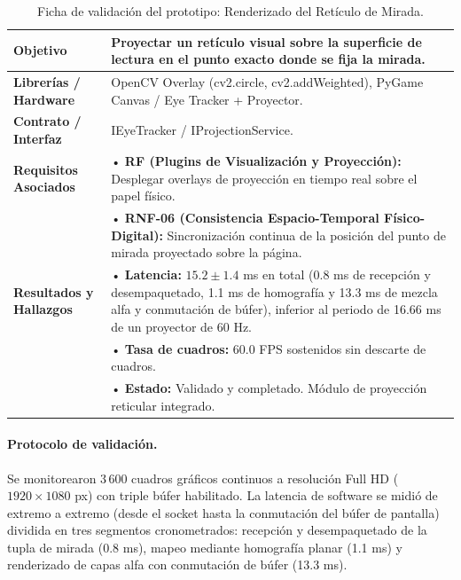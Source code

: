 \begin{table}[H]
    \centering
    \caption{Ficha de validación del prototipo: Renderizado del Retículo de Mirada.}
    \label{tab:ficha_f13}
    \begin{tabular}{|L{3.2cm}|L{11.0cm}|}
        \hline
        \textbf{Objetivo} & Proyectar un retículo visual sobre la superficie de lectura en el punto exacto donde se fija la mirada. \\ \hline
        \textbf{Librerías / Hardware} & OpenCV Overlay (cv2.circle, cv2.addWeighted), PyGame Canvas / Eye Tracker + Proyector. \\ \hline
        \textbf{Contrato / Interfaz} & IEyeTracker / IProjectionService. \\ \hline
        \textbf{Requisitos Asociados} &
        • \textbf{RF (Plugins de Visualización y Proyección):} Desplegar overlays de proyección en tiempo real sobre el papel físico. \vspace{0.1cm} \\
        & • \textbf{RNF-06 (Consistencia Espacio-Temporal Físico-Digital):} Sincronización continua de la posición del punto de mirada proyectado sobre la página. \\ \hline
        \textbf{Resultados y Hallazgos} &
        • \textbf{Latencia:} $15.2 \pm 1.4$ ms en total (0.8 ms de recepción y desempaquetado, 1.1 ms de homografía y 13.3 ms de mezcla alfa y conmutación de búfer), inferior al periodo de 16.66 ms de un proyector de 60 Hz. \vspace{0.1cm} \\
        & • \textbf{Tasa de cuadros:} 60.0 FPS sostenidos sin descarte de cuadros. \vspace{0.1cm} \\
        & • \textbf{Estado:} Validado y completado. Módulo de proyección reticular integrado. \\ \hline
    \end{tabular}
\end{table}
 
\paragraph{Protocolo de validación.} Se monitorearon 3\,600 cuadros gráficos continuos a resolución Full HD ($1920 \times 1080$ px) con triple búfer habilitado. La latencia de software se midió de extremo a extremo (desde el socket hasta la conmutación del búfer de pantalla) dividida en tres segmentos cronometrados: recepción y desempaquetado de la tupla de mirada (0.8 ms), mapeo mediante homografía planar (1.1 ms) y renderizado de capas alfa con conmutación de búfer (13.3 ms).
 
